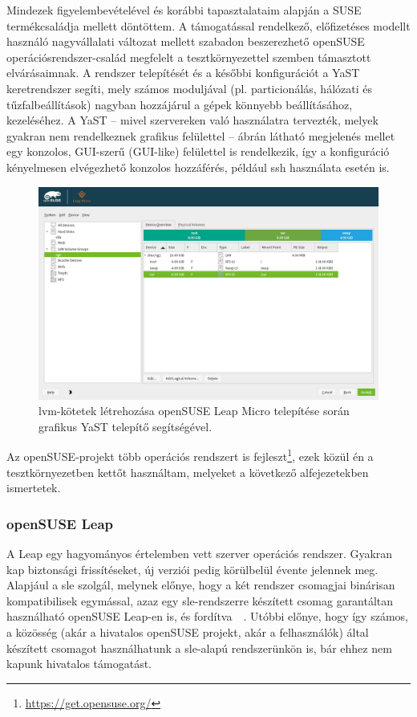 Mindezek figyelembevételével és korábbi tapasztalataim alapján a SUSE termékcsaládja mellett döntöttem. A támogatással rendelkező, előfizetéses modellt használó nagyvállalati változat mellett szabadon beszerezhető openSUSE operációsrendszer-család megfelelt a tesztkörnyezettel szemben támasztott elvárásaimnak. A rendszer telepítését és a későbbi konfigurációt a YaST keretrendszer segíti, mely számos moduljával (pl. particionálás, hálózati és tűzfalbeállítások) nagyban hozzájárul a gépek könnyebb beállításához, kezeléséhez. A YaST -- mivel szervereken való használatra tervezték, melyek gyakran nem rendelkeznek grafikus felülettel --  ábrán látható megjelenés mellet egy konzolos, GUI-szerű (GUI-like) felülettel is rendelkezik, így a konfiguráció kényelmesen elvégezhető konzolos hozzáférés, például \acrshort{ssh} használata esetén is.

\begin{figure}[!ht]
	\centering
	\includegraphics[width=15cm]{figures/yast-partitioner.png}
	\caption{\acrshort{lvm}-kötetek létrehozása openSUSE Leap Micro telepítése során grafikus YaST telepítő segítségével.}
	\label{fig:yast-partitioner}
\end{figure}

Az openSUSE-projekt több operációs rendszert is fejleszt\footnote{\url{https://get.opensuse.org/}}, ezek közül én a tesztkörnyezetben kettőt használtam, melyeket a következő alfejezetekben ismertetek.

\subsubsection{openSUSE Leap}
A Leap egy hagyományos értelemben vett szerver operációs rendszer. Gyakran kap biztonsági frissítéseket, új verziói pedig körülbelül évente jelennek meg. Alapjául a \acrfull{sle} szolgál, melynek előnye, hogy a két rendszer csomagjai binárisan kompatibilisek egymással, azaz egy \acrshort{sle}-rendszerre készített csomag garantáltan használható openSUSE Leap-en is, és fordítva~\cite{openSUSELeap15SP3intro}~\cite{SLE15SP3intro}. Utóbbi előnye, hogy így számos, a közösség (akár a hivatalos openSUSE projekt, akár a felhasználók) által készített csomagot használhatunk a \acrshort{sle}-alapú rendszerünkön is, bár ehhez nem kapunk hivatalos támogatást.

